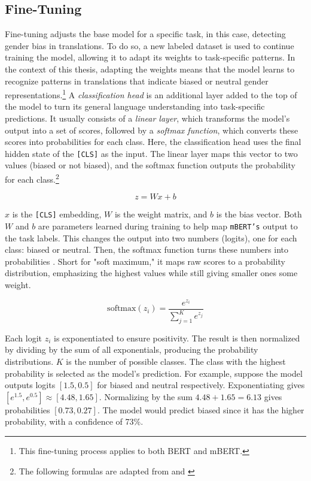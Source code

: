 \subsection{Fine-Tuning}
    Fine-tuning adjusts the base model for a specific task, in this case, detecting gender bias in translations. To do so, a new labeled dataset is used to continue training the model, allowing it to adapt its weights to task-specific patterns. In the context of this thesis, adapting the weights means that the model learns to recognize patterns in translations that indicate biased or neutral gender representations.\footnote{This fine-tuning process applies to both BERT and mBERT.} A \textit{classification head} is an additional layer added to the top of the model to turn its general language understanding into task-specific predictions. It usually consists of a \textit{linear layer}, which transforms the model’s output into a set of scores, followed by a \textit{softmax function}, which converts these scores into probabilities for each class. Here, the classification head uses the final hidden state of the \texttt{[CLS]} as the input. The linear layer maps this vector to two values (biased or not biased), and the softmax function outputs the probability for each class.\footnote{The following formulas are adapted from \textcite{devlinBERTPretrainingDeep2019} and \textcite{xiaoIntroductionTransformersNLP2023}}

    \[
    z = Wx + b 
    \]

   \(x\) is the \texttt{[CLS]} embedding, \(W\) is the weight matrix, and \(b\) is the bias vector. Both \(W\) and \(b\) are parameters learned during training to help map \texttt{mBERT’s} output to the task labels. This changes the output into two numbers (logits), one for each class: biased or neutral. Then, the softmax function turns these numbers into probabilities \parencite{devlinBERTPretrainingDeep2019,xiaoIntroductionTransformersNLP2023}. Short for "soft maximum," it maps raw scores to a probability distribution, emphasizing the highest values while still giving smaller ones some weight.

    \[
    \text{softmax}(z_i) = \frac{e^{z_i}}{\sum_{j=1}^{K} e^{z_j}}
    \]
    
    Each logit \( z_i \) is exponentiated to ensure positivity. The result is then normalized by dividing by the sum of all exponentials, producing the probability distributions. \( K \) is the number of possible classes. The class with the highest probability is selected as the model’s prediction. For example, suppose the model outputs logits $[1.5, 0.5]$ for biased and neutral respectively. Exponentiating gives $[e^{1.5}, e^{0.5}] \approx [4.48, 1.65]$. Normalizing by the sum $4.48 + 1.65 = 6.13$ gives probabilities $[0.73, 0.27]$. The model would predict biased since it has the higher probability, with a confidence of 73\%.

